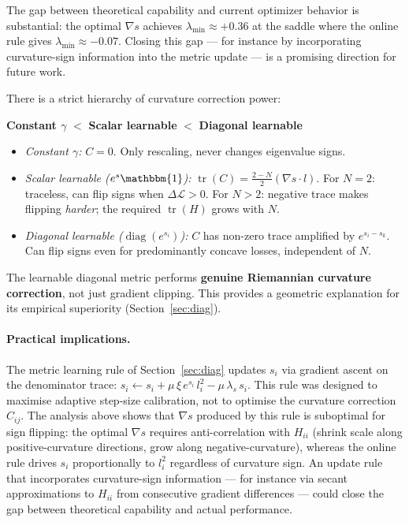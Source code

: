 \documentclass{article}
\newcommand{\loss}{\mathcal{L}}
\newcommand{\Id}{\mathbbm{1}}
\begin{document}
The gap between theoretical capability and current optimizer behavior
is substantial:
the optimal $\nabla s$ achieves $\lambda_{\min} \approx +0.36$ at the
saddle where the online rule gives $\lambda_{\min} \approx -0.07$.
Closing this gap --- for instance by incorporating curvature-sign
information into the metric update --- is a promising direction
for future work.

\begin{tcolorbox}[colback=blue!4, colframe=blue!25, breakable,
  title=\textbf{Key Finding: Hierarchy of Curvature Correction},
  coltitle=black]
There is a strict hierarchy of curvature correction power:
\begin{center}
\textbf{Constant $\gamma$} $<$
\textbf{Scalar learnable} $<$
\textbf{Diagonal learnable}
\end{center}
\begin{itemize}[leftmargin=1.8em]
    \item \emph{Constant $\gamma$:} $C=0$.
    Only rescaling, never changes eigenvalue signs.
    \item \emph{Scalar learnable ($e^s\Id$):}
    $\operatorname{tr}(C) = \tfrac{2-N}{2}(\nabla s\cdot l)$.
    For $N=2$: traceless, can flip signs when $\Delta\loss > 0$.
    For $N>2$: negative trace makes flipping \emph{harder};
    the required $\operatorname{tr}(H)$ grows with $N$.
    \item \emph{Diagonal learnable ($\operatorname{diag}(e^{s_i})$):}
    $C$ has non-zero trace amplified by $e^{s_i - s_k}$.
    Can flip signs even for predominantly concave losses,
    independent of $N$.
\end{itemize}
The learnable diagonal metric performs \textbf{genuine Riemannian curvature
correction}, not just gradient clipping.
This provides a geometric explanation for its empirical superiority
(Section~\ref{sec:diag}).
\end{tcolorbox}

\paragraph{Practical implications.}
The metric learning rule of Section~\ref{sec:diag}
updates $s_i$ via gradient ascent on the denominator trace:
$s_i \leftarrow s_i + \mu\,\xi\,e^{s_i}\,l_i^2 - \mu\,\lambda_s\,s_i$.
This rule was designed to maximise adaptive step-size calibration,
not to optimise the curvature correction $C_{ij}$.
The analysis above shows that $\nabla s$ produced by this rule
is suboptimal for sign flipping: the optimal $\nabla s$ requires
anti-correlation with $H_{ii}$ (shrink scale along positive-curvature
directions, grow along negative-curvature),
whereas the online rule drives $s_i$ proportionally to $l_i^2$
regardless of curvature sign.
An update rule that incorporates curvature-sign information ---
for instance via secant approximations to $H_{ii}$ from
consecutive gradient differences --- could close the gap
between theoretical capability and actual performance.
\end{document}
